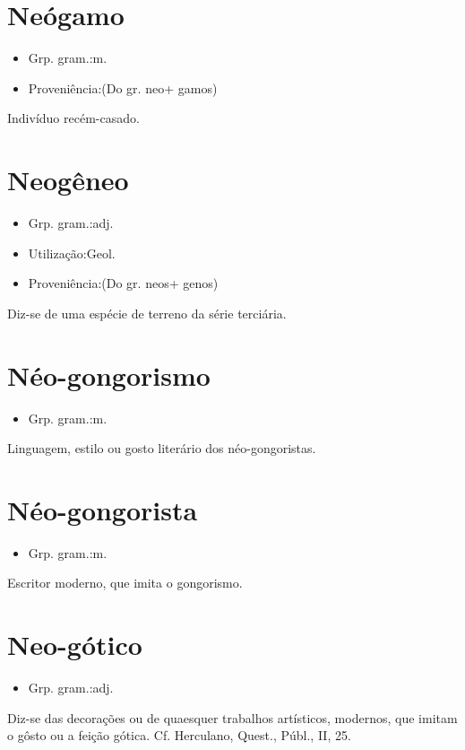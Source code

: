 \section{Neógamo}
\begin{itemize}
\item {Grp. gram.:m.}
\end{itemize}
\begin{itemize}
\item {Proveniência:(Do gr. \textunderscore neo\textunderscore  + \textunderscore gamos\textunderscore )}
\end{itemize}
Indivíduo recém-casado.
\section{Neogêneo}
\begin{itemize}
\item {Grp. gram.:adj.}
\end{itemize}
\begin{itemize}
\item {Utilização:Geol.}
\end{itemize}
\begin{itemize}
\item {Proveniência:(Do gr. \textunderscore neos\textunderscore  + \textunderscore genos\textunderscore )}
\end{itemize}
Diz-se de uma espécie de terreno da série terciária.
\section{Néo-gongorismo}
\begin{itemize}
\item {Grp. gram.:m.}
\end{itemize}
Linguagem, estilo ou gosto literário dos néo-gongoristas.
\section{Néo-gongorista}
\begin{itemize}
\item {Grp. gram.:m.}
\end{itemize}
Escritor moderno, que imita o gongorismo.
\section{Neo-gótico}
\begin{itemize}
\item {Grp. gram.:adj.}
\end{itemize}
Diz-se das decorações ou de quaesquer trabalhos artísticos, modernos, que imitam o gôsto ou a feição gótica. Cf. Herculano, \textunderscore Quest., Públ.\textunderscore , II, 25.
